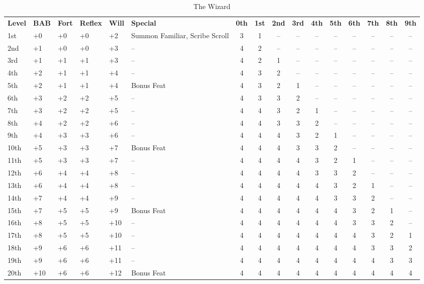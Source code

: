 \begin{table}[htb]
\caption{The Wizard}
\centering
\begin{tabular}{*{5}{l}p{2cm}*{10}{c}}
\textbf{Level} & \textbf{BAB} & \textbf{Fort} & \textbf{Reflex} & \textbf{Will} & \textbf{Special} & \textbf{0th} & \textbf{1st} & \textbf{2nd} & \textbf{3rd} & \textbf{4th} & \textbf{5th} & \textbf{6th} & \textbf{7th} & \textbf{8th} & \textbf{9th} \\
1st & +0 & +0 & +0 & +2 & \raggedright{}Summon Familiar, Scribe Scroll & 3 & 1 & -- & -- & -- & -- & -- & -- & -- & --\\
2nd & +1 & +0 & +0 & +3 & -- & 4 & 2 & -- & -- & -- & -- & -- & -- & -- & --\\
3rd & +1 & +1 & +1 & +3 & -- & 4 & 2 & 1 & -- & -- & -- & -- & -- & -- & --\\
4th & +2 & +1 & +1 & +4 & -- & 4 & 3 & 2 & -- & -- & -- & -- & -- & -- & --\\
5th & +2 & +1 & +1 & +4 & Bonus Feat & 4 & 3 & 2 & 1 & -- & -- & -- & -- & -- & --\\
6th & +3 & +2 & +2 & +5 & -- & 4 & 3 & 3 & 2 & -- & -- & -- & -- & -- & --\\
7th & +3 & +2 & +2 & +5 & -- & 4 & 4 & 3 & 2 & 1 & -- & -- & -- & -- & --\\
8th & +4 & +2 & +2 & +6 & -- & 4 & 4 & 3 & 3 & 2 & -- & -- & -- & -- & --\\
9th & +4 & +3 & +3 & +6 & -- & 4 & 4 & 4 & 3 & 2 & 1 & -- & -- & -- & --\\
10th & +5 & +3 & +3 & +7 & Bonus Feat & 4 & 4 & 4 & 3 & 3 & 2 & -- & -- & -- & --\\
11th & +5 & +3 & +3 & +7 & -- & 4 & 4 & 4 & 4 & 3 & 2 & 1 & -- & -- & --\\
12th & +6 & +4 & +4 & +8 & -- & 4 & 4 & 4 & 4 & 3 & 3 & 2 & -- & -- & --\\
13th & +6 & +4 & +4 & +8 & -- & 4 & 4 & 4 & 4 & 4 & 3 & 2 & 1 & -- & --\\
14th & +7 & +4 & +4 & +9 & -- & 4 & 4 & 4 & 4 & 4 & 3 & 3 & 2 & -- & --\\
15th & +7 & +5 & +5 & +9 & Bonus Feat & 4 & 4 & 4 & 4 & 4 & 4 & 3 & 2 & 1 & --\\
16th & +8 & +5 & +5 & +10 & -- & 4 & 4 & 4 & 4 & 4 & 4 & 3 & 3 & 2 & --\\
17th & +8 & +5 & +5 & +10 & -- & 4 & 4 & 4 & 4 & 4 & 4 & 4 & 3 & 2 & 1\\
18th & +9 & +6 & +6 & +11 & -- & 4 & 4 & 4 & 4 & 4 & 4 & 4 & 3 & 3 & 2\\
19th & +9 & +6 & +6 & +11 & -- & 4 & 4 & 4 & 4 & 4 & 4 & 4 & 4 & 3 & 3\\
20th & +10 & +6 & +6 & +12 & Bonus Feat & 4 & 4 & 4 & 4 & 4 & 4 & 4 & 4 & 4 & 4\\
\end{tabular}
\end{table}

